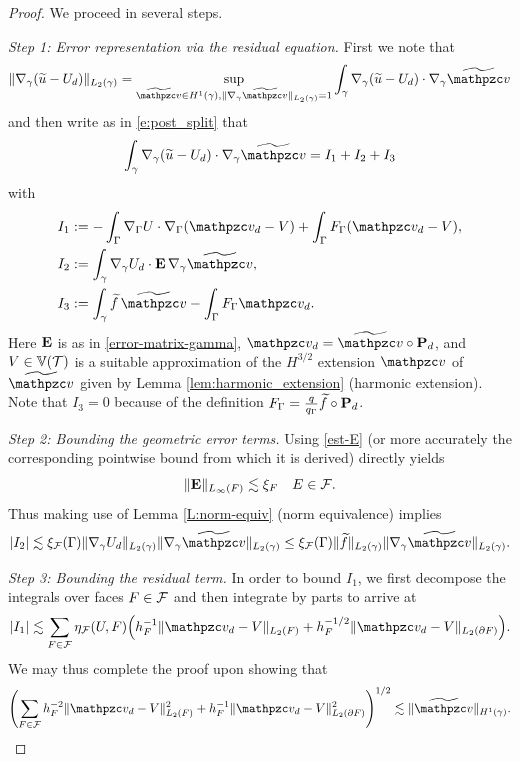 \begin{proof}
We proceed in several steps.

\medskip\noindent
{\it Step 1:  Error representation via the residual equation.}
First we note that
$$
\|\nabla_\gamma(\wu-U_d)\|_{L_2(\gamma)} = \sup_{\wv \in H^1(\gamma), \|\nabla_\gamma \wv\|_{L_2(\gamma)}=1} \int_\gamma \nabla_\gamma(\wu-U_d)\cdot \nabla_\gamma \wv
$$
and then write as in \eqref{e:post_split} that
$$
\int_\gamma \nabla_\gamma(\wu-U_d)\cdot \nabla_\gamma \wv = I_1+I_2+I_3
$$
with
\begin{align*}
I_1& :=-\int_\Gamma \nabla_\Gamma U \cdot \nabla_\Gamma(\tv_d-\tV)+ \int_\Gamma F_\Gamma (\tv_d-\tV),
\\ I_2 & := \int_\gamma \nabla_\gamma U_d \cdot \bE \, \nabla_\gamma \wv,
\\ I_3 & := \int_\gamma \wf \, \wv - \int_\Gamma F_\Gamma \tv_d.
\end{align*}
%
Here ${\bf E}$ is as in \eqref{error-matrix-gamma}, $\tv_d=\wv\circ\bP_d$, and $V\in\mathbb{V}(\mathcal T)$ is a suitable approximation of the $H^{3/2}$ extension $\tv$ of $\wv$ given by Lemma \ref{lem:harmonic_extension} (harmonic extension). Note that $I_3=0$ because of the definition $F_\Gamma=\frac{q}{q_\Gamma} \widetilde{f} \circ {\bf P}_d$.

\medskip\noindent
{\it Step 2:  Bounding the geometric error terms.}
Using \eqref{est-E} (or more accurately the corresponding pointwise bound from which it is derived) directly yields
%
$$\|{\bf E}\|_{L_\infty(F)} \lesssim \xi_F
\quad E\in\mathcal{F}.$$
%
Thus making use of Lemma \ref{L:norm-equiv} (norm equivalence) implies
$$
|I_2| \lesssim \xi_\F(\Gamma) \|\nabla_\gamma U_d\|_{L_2(\gamma)} \|\nabla_\gamma \wv\|_{L_2(\gamma)} \le \xi_\F(\Gamma) \|\wf \|_{L_2(\gamma)} \|\nabla_\gamma \wv\|_{L_2(\gamma)}.
$$

\noindent
{\it Step 3:  Bounding the residual term.}
In order to bound $I_1$, we first decompose the integrals over faces $F\in\mathcal{F}$
and then integrate by parts to arrive at
%
$$
|I_1| \lesssim \sum_{F \in \mathcal{F}} \eta_\F(U,F)\Big(h_F^{-1} \|\tv_d-\tV\|_{L_2(F)} + h_F^{-1/2} \|\tv_d-\tV\|_{L_2(\partial F)}\Big).
$$
%
We may thus complete the proof upon showing that
$$
\left ( \sum_{F \in \mathcal{F}} h_F^{-2} \|\tv_d-\tV\|_{L_2(F)}^2+ h_F^{-1} \|\tv_d-\tV\|_{L_2(\partial F)}^2 \right ) ^{1/2} \lesssim \|\wv \|_{H^1(\gamma)}.
$$


\end{proof}
